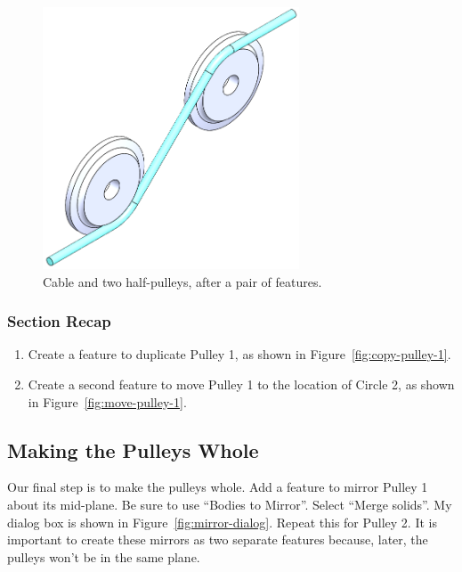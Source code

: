 \begin{figure}[H]
\begin{center}
  \includegraphics[width=3in]{images/figures/cable-and-half-pulleys.png}
\end{center}
\caption{Cable and two half-pulleys, after a pair of  features.
\label{fig:cable-and-half-pulleys}}

\end{figure}

\subsubsection{Section Recap}

\begin{enumerate}
\item{} Create a  feature to duplicate Pulley 1, as shown in
Figure~\ref{fig:copy-pulley-1}.
\item{} Create a second  feature to move Pulley 1 to the location of
Circle 2, as shown in Figure~\ref{fig:move-pulley-1}.
\end{enumerate}

\subsection{Making the Pulleys Whole}

\label{sec:mirror_pulleys}

Our final step is to make the pulleys whole. Add a  feature
to mirror Pulley 1 about its mid-plane. Be sure to use ``Bodies to Mirror''. Select ``Merge solids''. My
 dialog box is shown in Figure~\ref{fig:mirror-dialog}. Repeat this for
Pulley 2. It is important to create these mirrors as two separate features
because, later, the pulleys won't be in the same plane.

